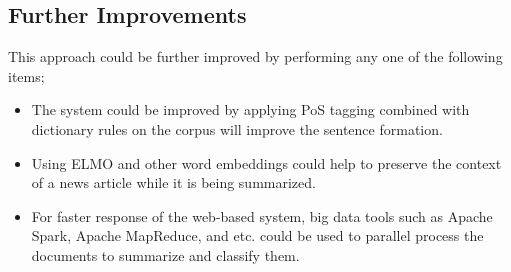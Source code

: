 \documentclass[a4paper,4pt]{article}
\begin{document}
\subsection{Further Improvements}
This approach could be further improved by performing any one of the following items;
\begin{itemize}
    \item The system could be improved by applying PoS tagging combined with dictionary rules on the corpus will improve 
    the sentence formation.
    \item Using ELMO and other word embeddings could help to preserve the context of a news article while it is being summarized.
    \item For faster response of the web-based system, big data tools such as Apache Spark, Apache MapReduce, and etc. could be used 
    to parallel process the documents to summarize and classify them.
\end{itemize}


\end{document}
